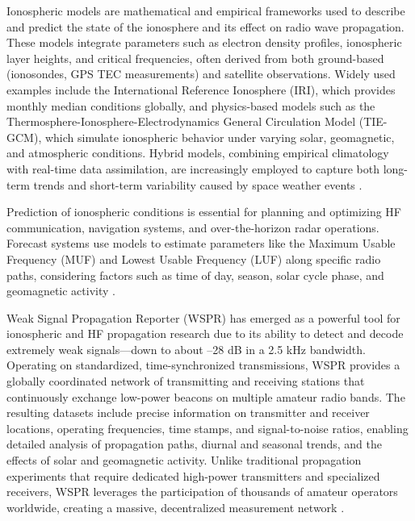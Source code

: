 \documentclass[signals,article,submit,pdftex,moreauthors]{Definitions/mdpi}
\begin{document}
Ionospheric models are mathematical and empirical frameworks used to describe
and predict the state of the ionosphere and its effect on radio wave
propagation. These models integrate parameters such as electron density
profiles, ionospheric layer heights, and critical frequencies, often derived
from both ground-based (ionosondes, GPS TEC measurements) and satellite
observations. Widely used examples include the International Reference
Ionosphere (IRI), which provides monthly median conditions globally, and
physics-based models such as the Thermosphere-Ionosphere-Electrodynamics
General Circulation Model (TIE-GCM), which simulate ionospheric behavior under
varying solar, geomagnetic, and atmospheric conditions. Hybrid models,
combining empirical climatology with real-time data assimilation, are
increasingly employed to capture both long-term trends and short-term
variability caused by space weather events
\cite{zolesi2014}.

Prediction of ionospheric conditions is essential for planning and optimizing
HF communication, navigation systems, and over-the-horizon radar operations.
Forecast systems use models to estimate parameters like the Maximum Usable
Frequency (MUF) and Lowest Usable Frequency (LUF) along specific radio paths,
considering factors such as time of day, season, solar cycle phase, and
geomagnetic activity \cite{lo2022systematic}.


Weak Signal Propagation Reporter (WSPR) has emerged as a powerful tool for
ionospheric and HF propagation research \cite{zander2022simple} due to its ability to detect and decode
extremely weak signals—down to about –28 dB in a 2.5 kHz bandwidth. Operating
on standardized, time-synchronized transmissions, WSPR provides a globally
coordinated network of transmitting and receiving stations that continuously
exchange low-power beacons on multiple amateur radio bands. The resulting
datasets include precise information on transmitter and receiver locations,
operating frequencies, time stamps, and signal-to-noise ratios, enabling
detailed analysis of propagation paths, diurnal and seasonal trends, and the
effects of solar and geomagnetic activity. Unlike traditional propagation
experiments that require dedicated high-power transmitters and specialized
receivers, WSPR leverages the participation of thousands of amateur operators
worldwide, creating a massive, decentralized measurement network
\cite{taylor2010, vanhamel2022using}.
\end{document}
